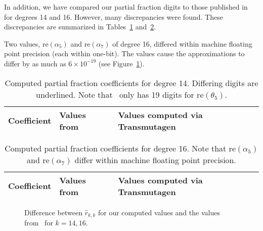 
In addition, we have compared our partial fraction digits to those published
in~\cite{pusa2012correction} for degrees 14 and 16. However, many
discrepancies were found. These discrepancies are summarized in
Tables~\ref{table:pusa-degree-14} and~\ref{table:pusa-degree-16}.

Two values, $\mathrm{re}(\alpha_5)$ and $\mathrm{re}(\alpha_7)$ of degree 16,
differed within machine floating point precision (each within one-bit). The
values cause the approximations to differ by as much as $6\times10^{-19}$ (see
Figure~\ref{fig:pusa-differences}).

\setul{}{1pt}

\begin{table}[h!]
\centering
\begin{tabular}{ r l l }
Coefficient & Values from~\cite{pusa2012correction} & Values computed via Transmutagen \\
\hline

\end{tabular}
\caption{Computed partial fraction coefficients for degree 14. Differing
  digits are underlined. Note that~ only has 19
  digits for $\mathrm{re}(\theta_5)$.}
\label{table:pusa-degree-14}
\end{table}

\begin{table}[h!]
\centering
\begin{tabular}{ r l l }
Coefficient & Values from~\cite{pusa2012correction} & Values computed via Transmutagen \\
\hline

\end{tabular}
\caption{Computed partial fraction coefficients for degree 16. Note that
  $\mathrm{re}(\alpha_5)$ and $\mathrm{re}(\alpha_7)$ differ within machine
  floating point precision.}
\label{table:pusa-degree-16}
\end{table}

\begin{figure}[!ht]
\centering
\resizebox{0.9\textwidth}{!}{}
\caption{Difference between $\hat{r}_{k,k}$ for our computed values and the
  values from~ for $k=14,16$.}
\label{fig:pusa-differences}
\end{figure}

